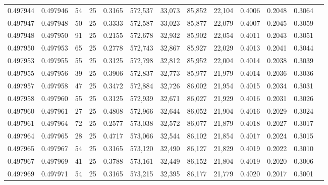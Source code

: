 \begin{tabular}{rrrrrrrrrrrrr}
0.497944 & 0.497946 &    54 &  25 &                                     0.3165 & 572,537 &  33,073 &  85,852 &  22,104 & 0.4006 & 0.2048 & 0.3064 \\
0.497947 & 0.497948 &    50 &  25 &                                     0.3333 & 572,587 &  33,023 &  85,877 &  22,079 & 0.4007 & 0.2045 & 0.3059 \\
0.497948 & 0.497950 &    91 &  25 &                                     0.2155 & 572,678 &  32,932 &  85,902 &  22,054 & 0.4011 & 0.2043 & 0.3051 \\
0.497950 & 0.497953 &    65 &  25 &                                     0.2778 & 572,743 &  32,867 &  85,927 &  22,029 & 0.4013 & 0.2041 & 0.3044 \\
0.497953 & 0.497955 &    55 &  25 &                                     0.3125 & 572,798 &  32,812 &  85,952 &  22,004 & 0.4014 & 0.2038 & 0.3039 \\
0.497955 & 0.497956 &    39 &  25 &                                     0.3906 & 572,837 &  32,773 &  85,977 &  21,979 & 0.4014 & 0.2036 & 0.3036 \\
0.497957 & 0.497958 &    47 &  25 &                                     0.3472 & 572,884 &  32,726 &  86,002 &  21,954 & 0.4015 & 0.2034 & 0.3031 \\
0.497958 & 0.497960 &    55 &  25 &                                     0.3125 & 572,939 &  32,671 &  86,027 &  21,929 & 0.4016 & 0.2031 & 0.3026 \\
0.497960 & 0.497961 &    27 &  25 &                                     0.4808 & 572,966 &  32,644 &  86,052 &  21,904 & 0.4016 & 0.2029 & 0.3024 \\
0.497961 & 0.497964 &    72 &  25 &                                     0.2577 & 573,038 &  32,572 &  86,077 &  21,879 & 0.4018 & 0.2027 & 0.3017 \\
0.497964 & 0.497965 &    28 &  25 &                                     0.4717 & 573,066 &  32,544 &  86,102 &  21,854 & 0.4017 & 0.2024 & 0.3015 \\
0.497965 & 0.497967 &    54 &  25 &                                     0.3165 & 573,120 &  32,490 &  86,127 &  21,829 & 0.4019 & 0.2022 & 0.3010 \\
0.497967 & 0.497969 &    41 &  25 &                                     0.3788 & 573,161 &  32,449 &  86,152 &  21,804 & 0.4019 & 0.2020 & 0.3006 \\
0.497969 & 0.497971 &    54 &  25 &                                     0.3165 & 573,215 &  32,395 &  86,177 &  21,779 & 0.4020 & 0.2017 & 0.3001 \\

\end{tabular}

